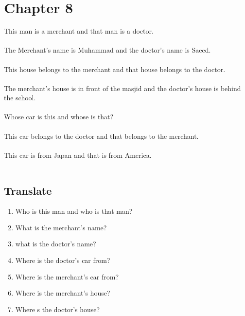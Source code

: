 \pagebreak
\section{Chapter 8}
\doublespace

This man is a merchant and that man is a doctor. \\[0.1in]\answerline\\ 
The Merchant's name is Muhammad and the doctor's name is Saeed. \\[0.1in]\answerline\\ 
This house belongs to the merchant and that house belongs to the doctor. \\[0.1in]\answerline\\ 
The merchant's house is in front of the masjid and the doctor's house is behind the school. \\[0.1in]\answerline\\ 
Whose car is this and whose is that? \\[0.1in]\answerline\\ 
This car belongs to the doctor and that belongs to the merchant. \\[0.1in]\answerline\\ 
This car is from Japan and that is from America. \\[0.1in]\answerline\\ 

\subsection{Translate}
\begin{enumerate}
    \item Who is this man and who is that man? \\[0.1in]\answerline
    \item What is the merchant's name? \\[0.1in]\answerline
    \item what is the doctor's name? \\[0.1in]\answerline
    \item Where is the doctor's car from? \\[0.1in]\answerline
    \item Where is the merchant's car from? \\[0.1in]\answerline
    \item Where is the merchant's house? \\[0.1in]\answerline
    \item Where s the doctor's house? \\[0.1in]\answerline
\end{enumerate}
\pagebreak

